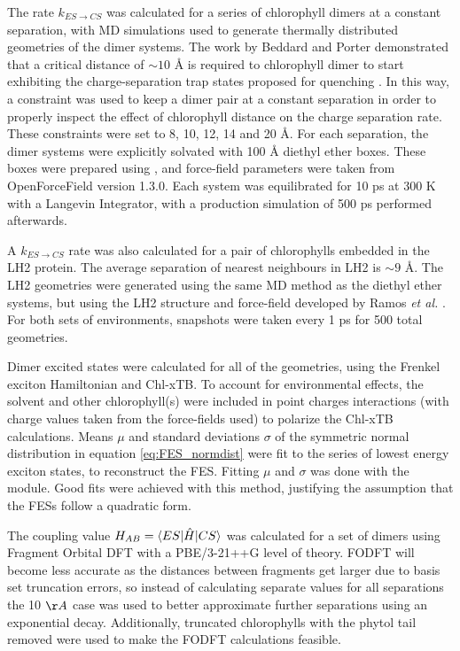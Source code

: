 The rate $k_{ES \rightarrow CS}$ was calculated for a series of chlorophyll dimers 
at a constant separation, with MD simulations used to generate thermally distributed
geometries of the dimer systems. The work by Beddard and Porter demonstrated that
a critical distance of $\sim 10$ \AA{} is required to chlorophyll dimer to start
exhibiting the charge-separation trap states proposed for quenching \cite{Beddard1976b}.
In this way, a constraint was used to keep a dimer pair at a constant separation 
in order to properly inspect the effect of chlorophyll distance on the charge separation
rate. These constraints were set to 8, 10, 12, 14 and 20 \AA{}. For each separation,
the dimer systems were explicitly solvated with 100 \AA{} diethyl ether boxes. These
boxes were prepared using , and force-field parameters were taken
from OpenForceField version 1.3.0. Each system was equilibrated for 10 ps at 300 K
with a Langevin Integrator, with a production simulation of 500 ps performed afterwards. 

A $k_{ES \rightarrow CS}$ rate  was also calculated for a pair of chlorophylls embedded
in the LH2 protein. The average separation of nearest neighbours in LH2 is $\sim 9$ \AA{}.
The LH2 geometries were generated using the same MD method as the diethyl ether 
systems, but using the LH2 structure and force-field developed by Ramos \emph{et al.} \cite{Mennucci2019}.
For both sets of environments, snapshots were taken every 1 ps for 500 total geometries. 

Dimer excited states were calculated for all of the geometries, using the Frenkel
exciton Hamiltonian and Chl-xTB. To account for environmental effects, the solvent
and other chlorophyll(s) were included in point charges interactions (with charge
values taken from the force-fields used) to polarize the Chl-xTB calculations. Means 
$\mu$ and standard deviations $\sigma$ of the symmetric normal distribution in equation
\ref{eq:FES_normdist} were fit to the series of lowest energy exciton states, to
reconstruct the FES. Fitting $\mu$ and $\sigma$ was done with the  
module. Good fits were achieved with this method, justifying the assumption that 
the FESs follow a quadratic form.

The coupling value $H_{AB} = \braket{ES|\hat{H}|CS}$ was calculated for a set of
dimers using Fragment Orbital DFT with a PBE/3-21++G level of theory. FODFT will
become less accurate as the distances between fragments get larger due to basis
set truncation errors, so instead of calculating separate values for all separations
the 10 $\AA{}$ case was used to better approximate further separations using an
exponential decay. Additionally, truncated chlorophylls with the phytol tail removed
were used to make the FODFT calculations feasible.

